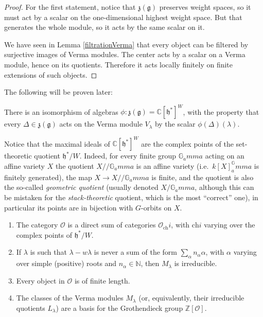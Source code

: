\begin{proof}
 For the first statement, notice that $\mathfrak z(\mathfrak g)$ preserves weight spaces, so it must act by a scalar on the one-dimensional highest weight space. But that generates the whole module, so it acts by the same scalar on it.

 We have seen in Lemma \ref{filtrationVerma} that every object can be filtered by surjective images of Verma modules. The center acts by a scalar on a Verma module, hence on its quotients. Therefore it acts locally finitely on finite extensions of such objects.
\end{proof}



The following will be proven later:

\begin{theorem}
There is an isomorphism of algebras $\phi:\mathfrak z(\mathfrak g)=\mathbb C[\mathfrak h^*]^W$, with the property that every $\Delta\in \mathfrak z(\mathfrak g)$ acts on the Verma module $V_\lambda$ by the scalar $\phi(\Delta)(\lambda)$.
\end{theorem}

Notice that the maximal ideals of $\mathbb C[\mathfrak h^*]^W$ are the complex points of the set-theoretic quotient $\mathfrak h^*/W$. Indeed, for every finite group $\mathbb G_amma$ acting on an affine variety $X$ the quotient $X// \mathbb G_amma$ is an affine variety (i.e.\ $k[X]^\mathbb G_amma$ is finitely generated), the map $X\to X// \mathbb G_amma$ is finite, and the quotient is also the so-called \emph{geometric quotient} (usually denoted $X/\mathbb G_amma$, although this can be mistaken for the \emph{stack-theoretic} quotient, which is the most ``correct'' one), in particular its points are in bijection with $G$-orbits on $X$. 

\begin{proposition}
 \begin{enumerate}
  \item The category $\mathcal O$ is a direct sum of categories $\mathcal O_\text{ch}i$, with $\text{ch}i$ varying over the complex points of $\mathfrak h^*/W$.
  \item If $\lambda$ is such that $\lambda-w\lambda$ is never a sum of the form $\sum_\alpha n_\alpha \alpha$, with $\alpha$ varying over simple (positive) roots and $n_\alpha\in\mathbb N$, then $M_\lambda$ is irreducible.
  \item Every object in $\mathcal O$ is of finite length. 
  \item The classes of the Verma modules $M_\lambda$ (or, equivalently, their irreducible quotients $L_\lambda$) are a basis for the Grothendieck group $\mathbb Z[\mathcal{O}]$.
 \end{enumerate}
\end{proposition}

